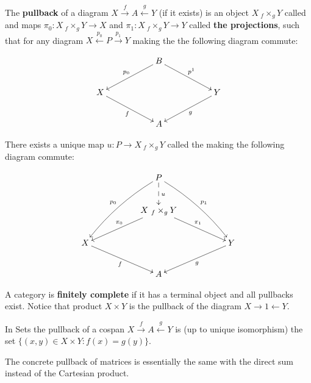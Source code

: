 \begin{definition}
The {\bf pullback} of a diagram  $X \xrightarrow{f} A \xleftarrow{g} Y$ (if it exists) is an object $X\ {}_f \times_{g} Y$ called and maps $\pi_0:X\ {}_f \times_{g} Y\to X$ and  $\pi_1:X\ {}_f \times_{g} Y\to Y$ called {\bf the  projections}, such that for any diagram $X \xleftarrow{p_0} P \xrightarrow{p_1} Y$ making the the following diagram commute:

$$
\xymatrix{
    &
    & B   \ar[dll]_{p_0} \ar[drr]^{p^1}
    &
    &
  \\X \ar[drr]_f 
    &
    & 
    &
    & Y  \ar[dll]^{g}
  \\
    &
    & A
    &
    & 
}
$$

There exists a unique map $u: P\to X\ {}_f\times_g Y $ called the making the following diagram commute:

$$
\xymatrix{
    &
    & P \ar@/_/[ddll]_{p_0}  \ar@/^/[ddrr]^{p_1} \ar@{-->}[d]^{u}
    &
    &
  \\
    &
    & X\ {}_f \times_{g} Y  \ar[dll]_{\pi_0} \ar[drr]^{\pi_1}
    &
    &
  \\X \ar[drr]_f 
    &
    & 
    &
    & Y \ar[dll]^g 
  \\
    &
    & A
    &
    & 
}
$$

A category is {\bf finitely complete} if it has a terminal object and all pullbacks exist. Notice that product $X\times Y$ is the pullback of the diagram $X \rightarrow 1 \leftarrow Y$.
\end{definition}

\begin{example} 
In Sets the pullback of a cospan $X \xrightarrow{f} A \xleftarrow{g} Y$ is (up to unique isomorphism) the set $\{(x,y) \in X\times Y : f(x) = g(y)\}$.


The concrete pullback of matrices is essentially the same with the direct sum instead of the Cartesian product.
\end{example}

